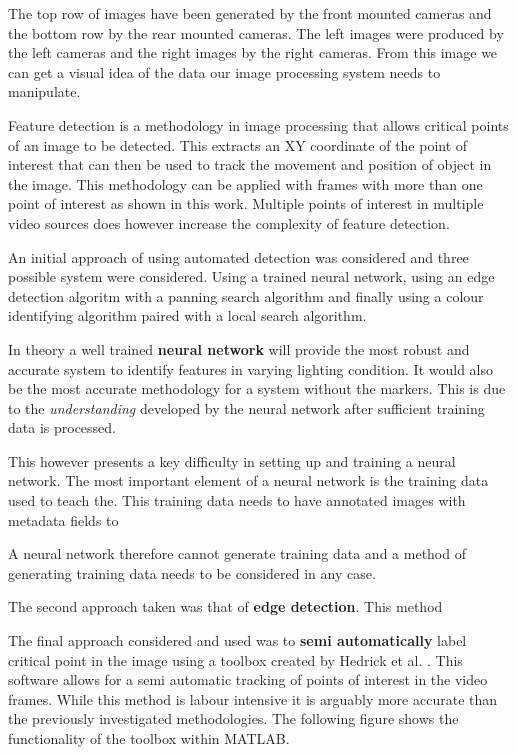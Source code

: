 The top row of images have been generated by the front mounted cameras and the bottom row by the rear mounted cameras. The left images were produced by the left cameras and the right images by the right cameras. From this image we can get a visual idea of the data our image processing system needs to manipulate.

Feature detection is a methodology in image processing that allows critical points of an image to be detected. This extracts an XY coordinate of the point of interest that can then be used to track the movement and position of object in the image. This methodology can be applied with frames with more than one point of interest as shown in this work. Multiple points of interest in multiple video sources does however increase the complexity of feature detection.

An initial approach of using automated detection was considered and three possible system were considered. Using a trained neural network, using an edge detection algoritm with a panning search algorithm and finally using a colour identifying algorithm paired with a local search algorithm.

In theory a well trained \textbf{neural network} will provide the most robust and accurate system to identify features in varying lighting condition. It would also be the most accurate methodology for a system without the markers. This is due to the \textit{understanding} developed by the neural network after sufficient training data is processed.

This however presents a key difficulty in setting up and training a neural network. The most important element of a neural network is the training data used to teach the. This training data needs to have annotated images with metadata fields to

A neural network therefore cannot generate training data and a method of generating training data needs to be considered in any case.

The second approach taken was that of \textbf{edge detection}. This method 

The final approach considered and used was to \textbf{semi automatically} label critical point in the image using a toolbox created by Hedrick et al. \cite{hedrick2008software}. This software allows for a semi automatic tracking of points of interest in the video frames. While this method is labour intensive it is arguably more accurate than the previously investigated methodologies. The following figure shows the functionality of the toolbox within MATLAB.

